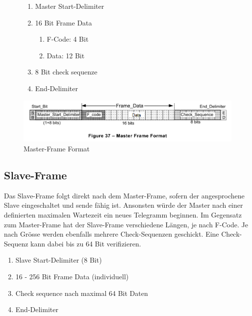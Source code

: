 \begin{figure}[H]
    \centering
    \begin{minipage}{0.33 \textwidth}
        \centering
        \begin{enumerate}
            \item Master Start-Delimiter
            \item 16 Bit Frame Data
            \begin{enumerate}
                \item F-Code: 4 Bit
                \item Data: 12 Bit
            \end{enumerate}
            \item 8 Bit check sequenze 
            \item End-Delimiter
        \end{enumerate}
    \end{minipage}
    \hfill
    \begin{minipage}{0.65 \textwidth}
        \includegraphics[width = \textwidth]{Figures/Chap2/Grundlagen/MVB_DOKU/Frames und Telegramme/Fig37_MasterFrameFormat.png}
        \caption{Master-Frame Format}
        \label{fig:MasterFrameFormat}
    \end{minipage}
        
\end{figure}

\subsection{Slave-Frame}
\label{sub:SlaveFrame}
Das Slave-Frame folgt direkt nach dem Master-Frame, sofern der angesprochene Slave eingeschaltet und sende fähig ist. Ansonsten würde der Master nach einer definierten maximalen Wartezeit ein neues Telegramm beginnen. \newline
Im Gegensatz zum Master-Frame hat der Slave-Frame verschiedene Längen, je nach F-Code. Je nach Grösse werden ebenfalls mehrere Check-Sequenzen geschickt. Eine Check-Sequenz kann dabei bis zu 64 Bit verifizieren.

\begin{enumerate}
    \item Slave Start-Delimiter (8 Bit)
    \item 16 - 256 Bit Frame Data (individuell)
    \item Check sequence nach maximal 64 Bit Daten 
    \item End-Delimiter
\end{enumerate}

